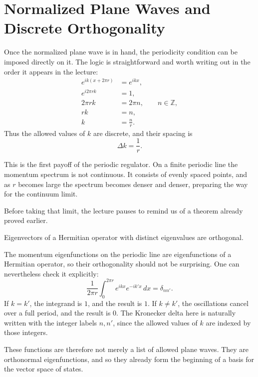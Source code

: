 \section{Normalized Plane Waves and Discrete Orthogonality}

Once the normalized plane wave is in hand, the periodicity condition can be imposed directly on it. The logic is straightforward and worth writing out in the order it appears in the lecture:
\begin{align}
e^{ik(x+2\pi r)} &= e^{ikx}, \\
e^{i2\pi rk} &= 1, \\
2\pi rk &= 2\pi n, \qquad n\in \mathbb{Z}, \\
rk &= n, \\
k &= \frac{n}{r}.
\end{align}
Thus the allowed values of \(k\) are discrete, and their spacing is
\begin{equation}
\Delta k = \frac{1}{r}.
\end{equation}

This is the first payoff of the periodic regulator. On a finite periodic line the momentum spectrum is not continuous. It consists of evenly spaced points, and as \(r\) becomes large the spectrum becomes denser and denser, preparing the way for the continuum limit.

Before taking that limit, the lecture pauses to remind us of a theorem already proved earlier.

\begin{theorem}
Eigenvectors of a Hermitian operator with distinct eigenvalues are orthogonal.
\end{theorem}

The momentum eigenfunctions on the periodic line are eigenfunctions of a Hermitian operator, so their orthogonality should not be surprising. One can nevertheless check it explicitly:
\begin{equation}
\frac{1}{2\pi r}\int_{0}^{2\pi r} e^{ikx}e^{-ik'x}\,dx=\delta_{nn'}.
\end{equation}
If \(k=k'\), the integrand is \(1\), and the result is \(1\). If \(k\neq k'\), the oscillations cancel over a full period, and the result is \(0\). The Kronecker delta here is naturally written with the integer labels \(n,n'\), since the allowed values of \(k\) are indexed by those integers.

These functions are therefore not merely a list of allowed plane waves. They are orthonormal eigenfunctions, and so they already form the beginning of a basis for the vector space of states.

